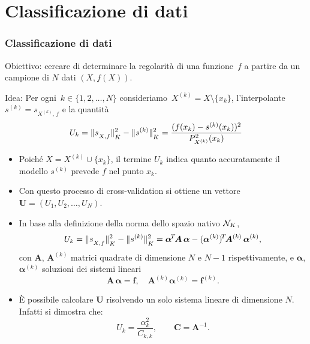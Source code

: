 \documentclass[10pt]{beamer}
\theoremstyle{definition}
\theoremstyle{plain}
\def\Cal#1{{\cal #1}}
\def\norm#1{\Vert #1\Vert}
\def\lK{{\lower.5ex\hbox{$\scriptstyle K$}}}
\def\lXf{{\lower.5ex\hbox{$\scriptstyle X, f$}}}
\begin{document}
\section{Classificazione di dati}
\begin{frame}
\frametitle{Classificazione di dati}
\alert{Obiettivo}: cercare di determinare la regolarità di una funzione~$f$ a partire da un campione di $N$ dati $(X, f(X))$.
\bigskip

\alert{Idea}: Per ogni~$k\in\{1,2,\dots, N\}$ consideriamo~$X^{(k)} = X\setminus \{x_k\}$, l’interpolante $s^{(k)} = s_{X^{(k)}\!,\, f}$ e la quantità
$$
U_k = \norm{s_\lXf}^2_\lK - \norm{s^{(k)}}^2_\lK = \frac{(f(x_k) - s^{(k)}(x_k))^2}{P^2_{X^{(k)}}(x_k)}
$$
\begin{itemize}
\item
Poiché $X=X^{(k)}\cup\{x_k\}$, il termine $U_k$
indica quanto accuratamente il modello $s^{(k)}$ prevede $f$ nel punto $x_k$.
\item
Con questo processo di \alert{cross-validation} si ottiene  un vettore $\bm U = (U_1,U_2,\dots, U_N)$.
\end{itemize}
\end{frame}


\begin{frame}
\begin{itemize}
\item In base alla definizione della norma dello spazio nativo $\Cal N_K$,
$$
U_k = \norm{s_\lXf}^2_\lK - \norm{s^{(k)}}^2_\lK = \bm \alpha^{\!T\!}\bm A\,\bm\alpha - (\bm\alpha^{(k)})^{\!T\!}\bm A^{(k)}\,\bm\alpha^{(k)},
$$
con $\bm A$,  $\bm A^{(k)}$ matrici quadrate di dimensione $N$ e $N-1$ rispettivamente, e $\bm\alpha$, $\bm\alpha^{(k)}$ soluzioni dei sistemi lineari
$$
\bm A\,\bm\alpha =\bm f,\quad \bm A^{(k)} \bm\alpha^{(k)} = \bm f^{(k)}.
$$ 


\item
È possibile calcolare $\bm U$ risolvendo un solo sistema lineare di dimensione $N$.  Infatti si dimostra che:
$$
U_k = \frac{\alpha_k^2}{C_{k,k}}, \qquad \bm C = \bm A^{-1}.
$$
\end{itemize}
\end{frame}
\end{document}
